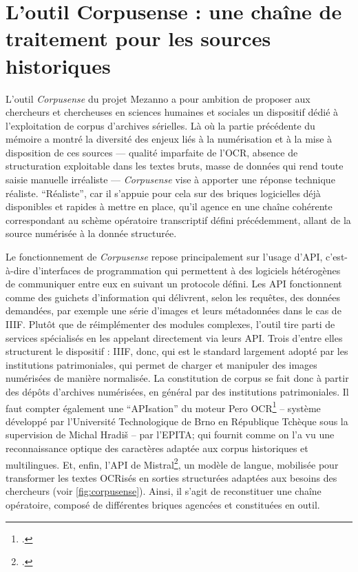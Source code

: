 \chapter[L'outil Corpusense]{L'outil Corpusense : une chaîne de traitement pour les sources historiques}

L’outil \emph{Corpusense} du projet Mezanno a pour ambition de proposer aux chercheurs et chercheuses en sciences humaines et sociales un dispositif dédié à l’exploitation de corpus d’archives sérielles. Là où la partie précédente du mémoire a montré la diversité des enjeux liés à la numérisation et à la mise à disposition de ces sources — qualité imparfaite de l’OCR, absence de structuration exploitable dans les textes bruts, masse de données qui rend toute saisie manuelle irréaliste — \emph{Corpusense} vise à apporter une réponse technique réaliste. \enquote{Réaliste}, car il s’appuie pour cela sur des briques logicielles déjà disponibles et rapides à mettre en place, qu’il agence en une chaîne cohérente correspondant au schème opératoire transcriptif défini précédemment, allant de la source numérisée à la donnée structurée.

Le fonctionnement de \emph{Corpusense} repose principalement sur l’usage d’API, c’est-à-dire d’interfaces de programmation qui permettent à des logiciels hétérogènes de communiquer entre eux en suivant un protocole défini. Les API fonctionnent comme des guichets d'information qui délivrent, selon les requêtes, des données demandées, par exemple une série d'images et leurs métadonnées dans le cas de IIIF. Plutôt que de réimplémenter des modules complexes, l’outil tire parti de services spécialisés en les appelant directement via leurs API. Trois d’entre elles structurent le dispositif : IIIF, donc, qui est le standard largement adopté par les institutions patrimoniales, qui permet de charger et manipuler des images numérisées de manière normalisée. La constitution de corpus se fait donc à partir des dépôts d'archives numérisées, en général par des institutions patrimoniales. Il faut compter également une \enquote{APIsation} du moteur Pero OCR\footcite[][]{pero} -- système développé par l'Université Technologique de Brno en République Tchèque sous la supervision de Michal Hradiš -- par l'EPITA; qui fournit comme on l'a vu une reconnaissance optique des caractères adaptée aux corpus historiques et multilingues. Et, enfin, l’API de Mistral\footcite[][]{mistral}, un modèle de langue, mobilisée pour transformer les textes OCRisés en sorties structurées adaptées aux besoins des chercheurs (voir \ref{fig:corpusense}). Ainsi, il s'agit de reconstituer une chaîne opératoire, composé de différentes briques agencées et constituées en outil.

